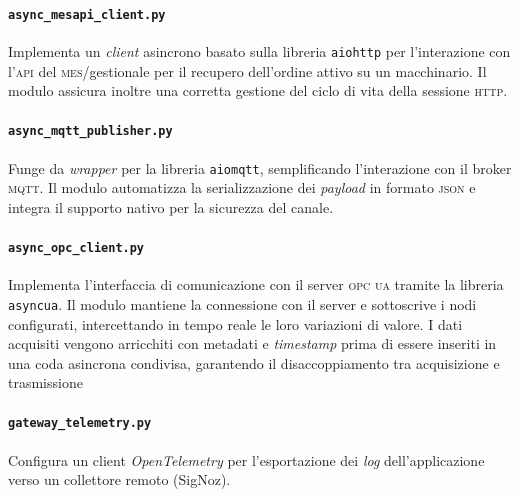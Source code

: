 \documentclass[12pt]{article}
\begin{document}
    \paragraph{\texttt{async\_mesapi\_client.py}} Implementa un \textit{client} asincrono basato sulla libreria \verb|aiohttp| per l'interazione con l'\textsc{api} del \textsc{mes}/gestionale per il recupero dell'ordine attivo su un macchinario. Il modulo assicura inoltre una corretta gestione del ciclo di vita della sessione \textsc{http}.

    \paragraph{\texttt{async\_mqtt\_publisher.py}} Funge da \textit{wrapper} per la libreria \verb|aiomqtt|, semplificando l'interazione con il broker \textsc{mqtt}. Il modulo automatizza la serializzazione dei \textit{payload} in formato \textsc{json} e integra il supporto nativo per la sicurezza del canale.

    \paragraph{\texttt{async\_opc\_client.py}} Implementa l'interfaccia di comunicazione con il server \textsc{opc ua} tramite la libreria \verb|asyncua|. Il modulo mantiene la connessione con il server e sottoscrive i nodi configurati, intercettando in tempo reale le loro variazioni di valore. I dati acquisiti vengono arricchiti con metadati e \textit{timestamp} prima di essere inseriti in una coda asincrona condivisa, garantendo il disaccoppiamento tra acquisizione e trasmissione

    \paragraph{\texttt{gateway\_telemetry.py}} Configura un client \textit{OpenTelemetry} per l'esportazione dei \textit{log} dell'applicazione verso un collettore remoto (SigNoz).
\end{document}
